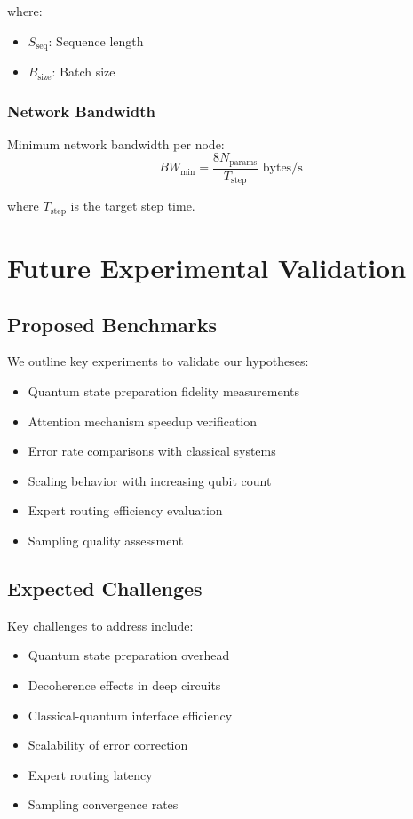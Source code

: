 \documentclass{article}
\begin{document}
where:
\begin{itemize}
\item $S_{\text{seq}}$: Sequence length
\item $B_{\text{size}}$: Batch size
\end{itemize}

\subsubsection{Network Bandwidth}
Minimum network bandwidth per node:
\begin{equation}
BW_{\text{min}} = \frac{8N_{\text{params}}}{T_{\text{step}}} \text{ bytes/s}
\end{equation}

where $T_{\text{step}}$ is the target step time.

\section{Future Experimental Validation}

\subsection{Proposed Benchmarks}
We outline key experiments to validate our hypotheses:

\begin{itemize}
\item Quantum state preparation fidelity measurements
\item Attention mechanism speedup verification
\item Error rate comparisons with classical systems
\item Scaling behavior with increasing qubit count
\item Expert routing efficiency evaluation
\item Sampling quality assessment
\end{itemize}

\subsection{Expected Challenges}
Key challenges to address include:

\begin{itemize}
\item Quantum state preparation overhead
\item Decoherence effects in deep circuits
\item Classical-quantum interface efficiency
\item Scalability of error correction
\item Expert routing latency
\item Sampling convergence rates
\end{itemize}
\end{document}
